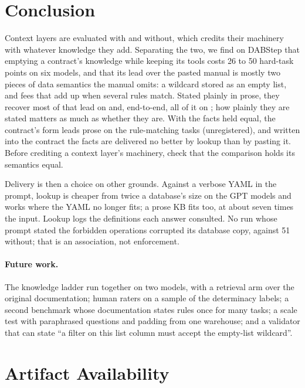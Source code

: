 \section{Conclusion}
\label{sec:conclusion}

Context layers are evaluated with and without, which credits their
machinery with whatever knowledge they add. Separating the two, we find on DABStep that emptying a contract's knowledge
while keeping its tools costs 26 to 50 hard-task points on six models,
and that its lead over the pasted manual is mostly two pieces of data
semantics the manual omits: a wildcard stored as an empty list, and fees
that add up when several rules match. Stated plainly in prose, they
recover most of that lead on \mLuna{} and, end-to-end, all of it on
\mQwen{}; how plainly they are stated matters as much as whether they
are. With the facts held equal, the contract's form leads prose on the
rule-matching tasks (unregistered), and written into the contract the
facts are delivered no better by lookup than by pasting it.
Before crediting a context layer's machinery, check that the comparison
holds its semantics equal.

Delivery is then a choice on other grounds. Against a verbose YAML in the
prompt, lookup is cheaper from twice a database's size on the GPT models
and works where the YAML no longer fits; a prose KB fits too, at about
seven times the input. Lookup logs the definitions each answer consulted.
No run whose prompt stated the forbidden operations corrupted its database
copy, against 51 without; that is an association, not enforcement.

\ifextended
\paragraph{Future work.} The knowledge ladder run together on two models,
with a retrieval arm over the original documentation; human raters on a
sample of the determinacy labels; a second benchmark whose documentation
states rules once for many tasks; a scale test with paraphrased questions
and padding from one warehouse; and a validator that can state ``a filter
on this list column must accept the empty-list wildcard''.

\section*{Artifact Availability}

